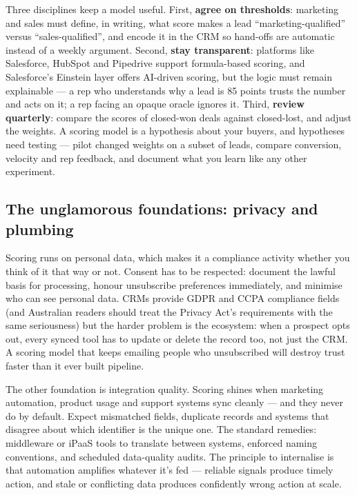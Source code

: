 Three disciplines keep a model useful. First, \textbf{agree on thresholds}: marketing and sales must define, in writing, what score makes a lead ``marketing-qualified'' versus ``sales-qualified'', and encode it in the CRM so hand-offs are automatic instead of a weekly argument. Second, \textbf{stay transparent}: platforms like Salesforce, HubSpot and Pipedrive support formula-based scoring, and Salesforce's Einstein layer offers AI-driven scoring, but the logic must remain explainable — a rep who understands why a lead is 85 points trusts the number and acts on it; a rep facing an opaque oracle ignores it. Third, \textbf{review quarterly}: compare the scores of closed-won deals against closed-lost, and adjust the weights. A scoring model is a hypothesis about your buyers, and hypotheses need testing — pilot changed weights on a subset of leads, compare conversion, velocity and rep feedback, and document what you learn like any other experiment.



\subsection{The unglamorous foundations: privacy and plumbing}


Scoring runs on personal data, which makes it a compliance activity whether you think of it that way or not. Consent has to be respected: document the lawful basis for processing, honour unsubscribe preferences immediately, and minimise who can see personal data. CRMs provide GDPR and CCPA compliance fields (and Australian readers should treat the Privacy Act's requirements with the same seriousness) but the harder problem is the ecosystem: when a prospect opts out, every synced tool has to update or delete the record too, not just the CRM. A scoring model that keeps emailing people who unsubscribed will destroy trust faster than it ever built pipeline.


The other foundation is integration quality. Scoring shines when marketing automation, product usage and support systems sync cleanly — and they never do by default. Expect mismatched fields, duplicate records and systems that disagree about which identifier is the unique one. The standard remedies: middleware or iPaaS tools to translate between systems, enforced naming conventions, and scheduled data-quality audits. The principle to internalise is that automation amplifies whatever it's fed — reliable signals produce timely action, and stale or conflicting data produces confidently wrong action at scale.



